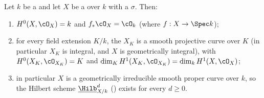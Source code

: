 \begin{proposition}
\label{prop:pc-XK-integral}
Let $k$ be a 
and let $X$ be a  over $k$ with a
 $\sigma$.  Then:
\begin{enumerate}
\item $H^0(X,\cO_X)=k$ and $f_*\cO_X=\cO_k$ (where $f:X\to\Spec k$);
\item for every field extension $K/k$, the
 $X_K$ is a smooth
projective curve over $K$ (in particular $X_K$ is integral, and $X$ is
geometrically integral), with $H^0(X_K,\cO_{X_K})=K$ and
$\dim_KH^1(X_K,\cO_{X_K})=\dim_kH^1(X,\cO_X)$;
\item in particular $X$ is a geometrically irreducible smooth proper curve
over $k$, so the Hilbert scheme
$\underline{\Hilb}^d_{X/k}$
() exists for every $d\geq0$.
\end{enumerate}
\end{proposition}

